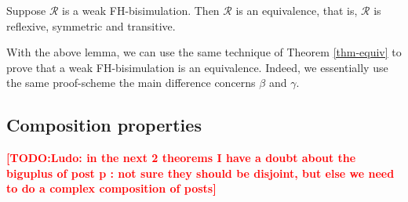 \documentclass{lncs/llncs}
\newcommand{\TODO}[1]{\textcolor{red}{\textbf{[TODO:#1]}}}
\begin{document}
\begin{theorem}\label{thm-weak-equiv} Suppose $\mathcal{R}$ 
is a weak FH-bisimulation. Then $\mathcal{R}$ is an equivalence, that is, $\mathcal{R}$ is 
reflexive, symmetric and transitive.
\end{theorem}

With the above lemma, we can use the same technique of Theorem \ref{thm-equiv}  to prove that a weak FH-bisimulation is an equivalence. Indeed, we essentially use the same proof-scheme the main difference concerns  $\beta$ and  $\gamma$.

 

       		



       		
\subsection{Composition properties}
\TODO{Ludo: in the next 2 theorems I have a doubt about the biguplus of post p : not sure they should be disjoint, but else we need to do a complex composition  of posts}
\end{document}
